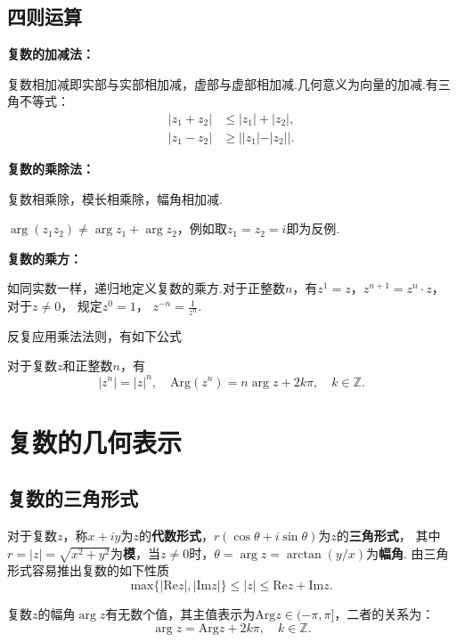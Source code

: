 \documentclass[openany,oneside]{ctexbook}
\begin{document}
\subsection{四则运算}

\par\noindent
\begin{minipage}[t]{0.45\textwidth}
    \raggedright
    \textbf{复数的加减法：}

    复数相加减即实部与实部相加减，虚部与虚部相加减.几何意义为向量的加减.有三角不等式：
    \begin{align*}
        |z_1 + z_2| &\leq |z_1| + |z_2|,\\
        |z_1 - z_2| &\geq ||z_1| - |z_2||.
    \end{align*}
\end{minipage}\hfill%
\begin{minipage}[t]{0.45\textwidth}
    \textbf{复数的乘除法：}

    复数相乘除，模长相乘除，幅角相加减.
    \begin{note*}[做乘法时幅角的主值不能相加减]
        $\arg(z_1 z_2) \neq \arg z_1 + \arg z_2$，例如取$z_1 = z_2 = i$即为反例.
    \end{note*}
\end{minipage}\par\vspace{8pt}
\noindent\textbf{复数的乘方：}
    
如同实数一样，递归地定义复数的乘方.对于正整数$n$，有$z^1 = z$，$z^{n+1} = z^n \cdot z$，对于$z \neq 0$， 规定$z^0 = 1$， $z^{-n} = \frac{1}{z^n}$.

反复应用乘法法则，有如下公式
\begin{theorem}[de Moivre公式]
    对于复数$z$和正整数$n$，有
    $$
        |z^n| = |z|^n,\quad\mathrm{Arg}(z^n) = n\arg z + 2k\pi, \quad k \in \mathbb{Z}.
    $$
\end{theorem}

\section{复数的几何表示}
\subsection{复数的三角形式}

对于复数$z$，称$x+iy$为$z$的\textbf{代数形式}，$r(\cos\theta + i\sin\theta)$为$z$的\textbf{三角形式}，
其中$r = |z| = \sqrt{x^2 + y^2}$为\textbf{模}，当$z\neq 0$时，$\theta = \arg z = \arctan(y/x)$为\textbf{幅角}.
由三角形式容易推出复数的如下性质
\[ \mathrm{max}\{\left|\mathrm{Re}z\right|,\left|\mathrm{Im}z\right|\} \leq |z| \leq \mathrm{Re} z + \mathrm{Im} z. \]
\begin{note*}[幅角及其主值]
    复数$z$的幅角$\arg z$有无数个值，其主值表示为$\mathrm{Arg} z \in (-\pi, \pi]$，二者的关系为：
    \[\arg z = \mathrm{Arg} z + 2k\pi, \quad k \in \mathbb{Z}.\]
\end{note*}
\end{document}
